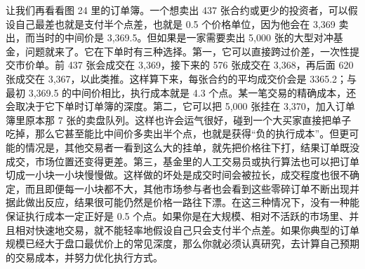 \begin{chineseblock}让我们再看看图 24 里的订单簿。一个想卖出 437 张合约或更少的投资者，可以假设自己最差也就是支付半个点差，也就是 0.5 个价格单位，因为他会在 3,369 卖出，而当时的中间价是 3,369.5。但如果是一家需要卖出 5,000 张的大型对冲基金，问题就来了。它在下单时有三种选择。第一，它可以直接跨过价差，一次性提交市价单。前 437 张会成交在 3,369，接下来的 576 张成交在 3,368，再后面 620 张成交在 3,367，以此类推。这样算下来，每张合约的平均成交价会是 3365.2；与最初 3,369.5 的中间价相比，执行成本就是 4.3 个点。某一笔交易的精确成本，还会取决于它下单时订单簿的深度。第二，它可以把 5,000 张挂在 3,370，加入订单簿里原本那 7 张的卖盘队列。这样也许会运气很好，碰到一个大买家直接把单子吃掉，那么它甚至能比中间价多卖出半个点，也就是获得“负的执行成本”。但更可能的情况是，其他交易者一看到这么大的挂单，就先把价格往下打，结果订单既没成交，市场位置还变得更差。第三，基金里的人工交易员或执行算法也可以把订单切成一小块一小块慢慢做。这样做的坏处是成交时间会被拉长，成交程度也很不确定，而且即便每一小块都不大，其他市场参与者也会看到这些零碎订单不断出现并据此做出反应，结果很可能仍然是价格一路往下漂。在这三种情况下，没有一种能保证执行成本一定正好是 0.5 个点。如果你是在大规模、相对不活跃的市场里、并且相对快速地交易，就不能轻率地假设自己只会支付半个点差。如果你典型的订单规模已经大于盘口最优价上的常见深度，那么你就必须认真研究，去计算自己预期的交易成本，并努力优化执行方式。\end{chineseblock}


